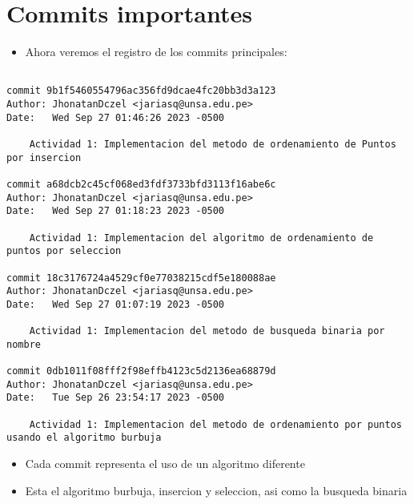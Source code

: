 \section{Commits importantes}
\begin{itemize}
    \item Ahora veremos el registro de los commits principales:
\end{itemize}
\begin{lstlisting}

commit 9b1f5460554796ac356fd9dcae4fc20bb3d3a123
Author: JhonatanDczel <jariasq@unsa.edu.pe>
Date:   Wed Sep 27 01:46:26 2023 -0500

    Actividad 1: Implementacion del metodo de ordenamiento de Puntos por insercion

commit a68dcb2c45cf068ed3fdf3733bfd3113f16abe6c
Author: JhonatanDczel <jariasq@unsa.edu.pe>
Date:   Wed Sep 27 01:18:23 2023 -0500

    Actividad 1: Implementacion del algoritmo de ordenamiento de puntos por seleccion

commit 18c3176724a4529cf0e77038215cdf5e180088ae
Author: JhonatanDczel <jariasq@unsa.edu.pe>
Date:   Wed Sep 27 01:07:19 2023 -0500

    Actividad 1: Implementacion del metodo de busqueda binaria por nombre

commit 0db1011f08fff2f98effb4123c5d2136ea68879d
Author: JhonatanDczel <jariasq@unsa.edu.pe>
Date:   Tue Sep 26 23:54:17 2023 -0500

    Actividad 1: Implementacion del metodo de ordenamiento por puntos usando el algoritmo burbuja

\end{lstlisting}
\begin{itemize}
    \item Cada commit representa el uso de un algoritmo diferente
    \item Esta el algoritmo burbuja, insercion y seleccion, asi como la busqueda binaria
\end{itemize}
	

\clearpage
	
%
%
%
			

